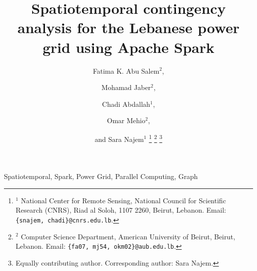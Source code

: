 \documentclass[journal]{IEEEtran}
\begin{document}
\title{Spatiotemporal contingency analysis for the Lebanese power grid using Apache Spark}


\author{Fatima K. Abu Salem$^{2}$, \and
Mohamad  Jaber$^{2}$, \and 
Chadi Abdallah$^{1}$, \and 
Omar Mehio$^{2}$, \and and Sara Najem$^{1}$
\thanks{$^1$ National Center for Remote Sensing, National Council for Scientific Research (CNRS), Riad al Soloh, 1107 2260, Beirut, Lebanon. Email: \texttt{\{snajem, chadi\}@cnrs.edu.lb}.}
\thanks{$^2$ Computer Science Department, American University of Beirut, Beirut, Lebanon. Email: \texttt{\{fa07, mj54, okm02\}@aub.edu.lb}.}
\thanks{Equally contributing author. Corresponding author: Sara Najem.}
}





%
{}


\maketitle


\begin{IEEEkeywords}
Spatiotemporal, Spark, Power Grid, Parallel Computing, Graph
\end{IEEEkeywords}


\IEEEpeerreviewmaketitle

\maketitle









\end{document}
